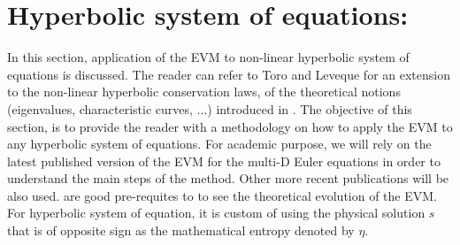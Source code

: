 \section{Hyperbolic system of equations:}\label{sec:hyp_sect1b}
In this section, application of the EVM to non-linear hyperbolic system of equations is discussed. The reader can refer to Toro \cite{Toro} and Leveque for an extension to the non-linear hyperbolic conservation laws, of the theoretical notions (eigenvalues, characteristic curves, $\dots$) introduced in . The objective of this section, is to provide the reader with a methodology on how to apply the EVM to any hyperbolic system of equations. For academic purpose, we will rely on the latest published version of the EVM \cite{valentin} for the multi-D Euler equations in order to understand the main steps of the method. Other more recent publications will be also used. \cite{jlg, jlg2} are good pre-requites to \cite{valentin} to see the theoretical evolution of the EVM. For hyperbolic system of equation, it is custom of using the physical solution $s$ that is of opposite sign as the mathematical entropy denoted by $\eta$.\\

